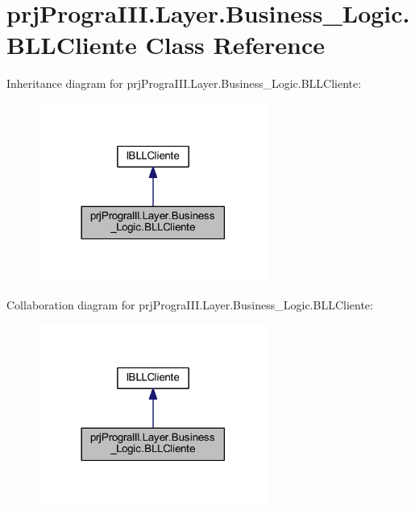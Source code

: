 \hypertarget{classprj_progra_i_i_i_1_1_layer_1_1_business___logic_1_1_b_l_l_cliente}{}\section{prj\+Progra\+I\+I\+I.\+Layer.\+Business\+\_\+\+Logic.\+B\+L\+L\+Cliente Class Reference}
\label{classprj_progra_i_i_i_1_1_layer_1_1_business___logic_1_1_b_l_l_cliente}


Inheritance diagram for prj\+Progra\+I\+I\+I.\+Layer.\+Business\+\_\+\+Logic.\+B\+L\+L\+Cliente\+:
\nopagebreak
\begin{figure}[H]
\begin{center}
\leavevmode
\includegraphics[width=213pt]{classprj_progra_i_i_i_1_1_layer_1_1_business___logic_1_1_b_l_l_cliente__inherit__graph}
\end{center}
\end{figure}


Collaboration diagram for prj\+Progra\+I\+I\+I.\+Layer.\+Business\+\_\+\+Logic.\+B\+L\+L\+Cliente\+:
\nopagebreak
\begin{figure}[H]
\begin{center}
\leavevmode
\includegraphics[width=213pt]{classprj_progra_i_i_i_1_1_layer_1_1_business___logic_1_1_b_l_l_cliente__coll__graph}
\end{center}
\end{figure}
